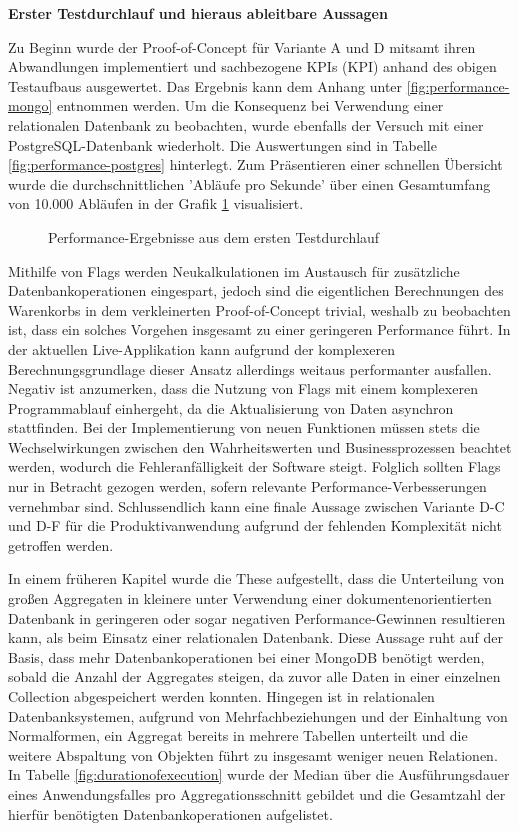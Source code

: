 \textbf{Erster Testdurchlauf und hieraus ableitbare Aussagen}

Zu Beginn wurde der Proof-of-Concept für Variante A und D mitsamt ihren Abwandlungen implementiert und sachbezogene \acrshort{KPI}s (\acrlong{KPI}) anhand des obigen Testaufbaus ausgewertet. Das Ergebnis kann dem Anhang unter \ref{fig:performance-mongo} entnommen werden. Um die Konsequenz bei Verwendung einer relationalen Datenbank zu beobachten, wurde ebenfalls der Versuch mit einer PostgreSQL-Datenbank wiederholt. Die Auswertungen sind in Tabelle \ref{fig:performance-postgres} hinterlegt. Zum Präsentieren einer schnellen Übersicht wurde die durchschnittlichen 'Abläufe pro Sekunde' über einen Gesamtumfang von 10.000 Abläufen in der Grafik \ref{fig:PerformanceDefault} visualisiert.

\begin{figure}[htpb]
	\centering
	\footnotesize
	
	\caption{Performance-Ergebnisse aus dem ersten Testdurchlauf}
	\label{fig:PerformanceDefault}
\end{figure}

Mithilfe von Flags werden Neukalkulationen im Austausch für zusätzliche Datenbankoperationen eingespart, jedoch sind die eigentlichen Berechnungen des Warenkorbs in dem verkleinerten Proof-of-Concept trivial, weshalb zu beobachten ist, dass ein solches Vorgehen insgesamt zu einer geringeren Performance führt. In der aktuellen Live-Applikation kann aufgrund der komplexeren Berechnungsgrundlage dieser Ansatz allerdings weitaus performanter ausfallen. Negativ ist anzumerken, dass die Nutzung von Flags mit einem komplexeren Programmablauf einhergeht, da die Aktualisierung von Daten asynchron stattfinden. Bei der Implementierung von neuen Funktionen müssen stets die Wechselwirkungen zwischen den Wahrheitswerten und Businessprozessen beachtet werden, wodurch die Fehleranfälligkeit der Software steigt. Folglich sollten Flags nur in Betracht gezogen werden, sofern relevante Performance-Verbesserungen vernehmbar sind. Schlussendlich kann eine finale Aussage zwischen Variante D-C und D-F für die Produktivanwendung aufgrund der fehlenden Komplexität nicht getroffen werden.

In einem früheren Kapitel wurde die These aufgestellt, dass die Unterteilung von großen Aggregaten in kleinere unter Verwendung einer dokumentenorientierten Datenbank in geringeren oder sogar negativen Performance-Gewinnen resultieren kann, als beim Einsatz einer relationalen Datenbank. Diese Aussage ruht auf der Basis, dass mehr Datenbankoperationen bei einer MongoDB benötigt werden, sobald die Anzahl der Aggregates steigen, da zuvor alle Daten in einer einzelnen Collection abgespeichert werden konnten. Hingegen ist in relationalen Datenbanksystemen, aufgrund von Mehrfachbeziehungen und der Einhaltung von Normalformen, ein Aggregat bereits in mehrere Tabellen unterteilt und die weitere Abspaltung von Objekten führt zu insgesamt weniger neuen Relationen. In Tabelle \ref{fig:durationofexecution} wurde der Median über die Ausführungsdauer eines Anwendungsfalles pro Aggregationsschnitt gebildet und die Gesamtzahl der hierfür benötigten Datenbankoperationen aufgelistet. 

